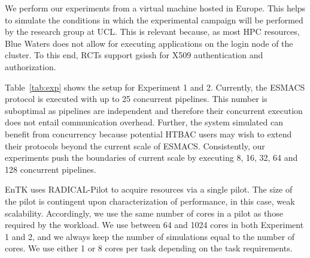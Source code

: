 We perform our experiments from a virtual machine hosted in Europe. This
helps to simulate the conditions in which the experimental campaign will be
performed by the research group at UCL\@. This is relevant because, as most
HPC resources, Blue Waters does not allow for executing applications on the
login node of the cluster. To this end, RCTs support \textmd{gsissh} for X509
authentication and authorization.

Table~\ref{tab:exp} shows the setup for Experiment 1 and 2. Currently, the ESMACS protocol is executed with up to 25 concurrent pipelines. This number is suboptimal as pipelines are independent and therefore their concurrent execution does not entail
communication overhead. Further, the system simulated can benefit from
concurrency because potential HTBAC users may wish to extend their protocols beyond the current scale of ESMACS\@. Consistently, our experiments push the boundaries of current scale by executing 8, 16, 32, 64 and 128 concurrent pipelines.


EnTK uses RADICAL-Pilot to acquire resources via a single pilot.  
The size of the pilot is contingent upon characterization of performance, in
this case, weak scalability. Accordingly, we use the same number of cores in a pilot 
as those required by the workload. 
We use between 64 and 1024 cores in both Experiment 1 and 2, and we always
keep the number of simulations equal to the number of cores. %
We use either 1 or 8 cores per task %
depending on the task requirements.




